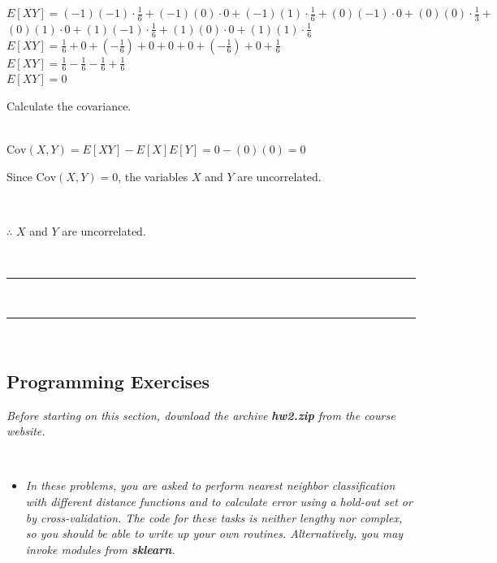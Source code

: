 \documentclass{article}
\begin{document}
$E[XY] = (-1)(-1) \cdot \frac{1}{6} + (-1)(0) \cdot 0 + (-1)(1) \cdot \frac{1}{6}+ (0)(-1) \cdot 0 + (0)(0) \cdot \frac{1}{3} + $\\
$(0)(1) \cdot 0+ (1)(-1) \cdot \frac{1}{6} + (1)(0) \cdot 0 + (1)(1) \cdot \frac{1}{6}$\\

$E[XY] = \frac{1}{6} + 0 + (-\frac{1}{6}) + 0 + 0 + 0 + (-\frac{1}{6}) + 0 + \frac{1}{6}$\\

$E[XY] = \frac{1}{6} - \frac{1}{6} - \frac{1}{6} + \frac{1}{6}$\\

$E[XY] = 0$\\

\parbox{\textwidth}{Calculate the covariance.}\\

$\text{Cov}(X, Y) = E[XY] - E[X]E[Y] = 0 - (0)(0) = 0$\\

\parbox{\textwidth}{Since $\text{Cov}(X, Y) = 0$, the variables $X$ and $Y$ are uncorrelated.}\\

\parbox{\textwidth}{$\therefore$ $X$ and $Y$ are uncorrelated.}\\

\noindent\rule{\textwidth}{0.4pt}\\

\noindent\rule{\textwidth}{0.4pt}\\


\newpage

\subsection*{Programming Exercises}

\parbox{\textwidth}{\textit{Before starting on this section, download the archive \textbf{hw2.zip} from the course website.}}\\
\begin{itemize}
    \item \textit{In these problems, you are asked to perform nearest neighbor classification with different distance functions and to calculate error using a hold-out set or by cross-validation. The code for these tasks is neither lengthy nor complex, so you should be able to write up your own routines. Alternatively, you may invoke modules from \textbf{sklearn}.}
\end{itemize}
\end{document}
